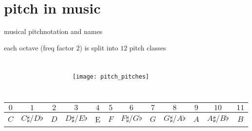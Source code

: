     \section[musical pitch]{pitch in music}
        \begin{frame}{musical pitch}{notation and names}
            
            each octave (freq factor $2$) is split into $12$ pitch classes
            \begin{columns}
            \begin{figure}
            \scalebox{.8}
            {
                
            }
            \end{figure}
            \begin{figure}
                \texttt{[image: pitch\_pitches]}
            \end{figure}
            \end{columns}

            \begin{footnotesize}
                \begin{table}
                    \centering
                    \begin{tabular}{cccccccccccc} %
                        \\ \hline
                        \bf{\emph{$0$}}	 & \bf{\emph{$1$}}	 & \bf{\emph{$2$}}	 & \bf{\emph{$3$}}	 & \bf{\emph{$4$}}	 & \bf{\emph{$5$}}	 & \bf{\emph{$6$}}	 & \bf{\emph{$7$}}	 & \bf{\emph{$8$}}	 & \bf{\emph{$9$}}	 & \bf{\emph{$10$}}	 & \bf{\emph{$11$}}\\ 
                         \hline
                        \bf{$C$}	 & $C\sharp / D\flat$	 & $D$	 & $D\sharp / E\flat$	 & E	 & $F$	 & $F\sharp / G\flat$	 & $G$	 & $G\sharp / A\flat$	 & $A$	 & $A\sharp / B\flat$	 & $B$\\
                    \end{tabular}
                \end{table}
            \end{footnotesize}
        \end{frame}
        
